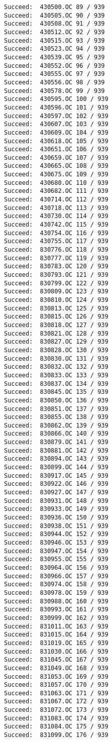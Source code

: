 \documentclass[11pt]{article}
\begin{document}
\begin{verbatim}
Succeed:  430500.OC 89 / 939
Succeed:  430505.OC 90 / 939
Succeed:  430508.OC 91 / 939
Succeed:  430512.OC 92 / 939
Succeed:  430515.OC 93 / 939
Succeed:  430523.OC 94 / 939
Succeed:  430539.OC 95 / 939
Succeed:  430552.OC 96 / 939
Succeed:  430555.OC 97 / 939
Succeed:  430556.OC 98 / 939
Succeed:  430578.OC 99 / 939
Succeed:  430595.OC 100 / 939
Succeed:  430596.OC 101 / 939
Succeed:  430597.OC 102 / 939
Succeed:  430607.OC 103 / 939
Succeed:  430609.OC 104 / 939
Succeed:  430618.OC 105 / 939
Succeed:  430651.OC 106 / 939
Succeed:  430659.OC 107 / 939
Succeed:  430665.OC 108 / 939
Succeed:  430675.OC 109 / 939
Succeed:  430680.OC 110 / 939
Succeed:  430682.OC 111 / 939
Succeed:  430714.OC 112 / 939
Succeed:  430718.OC 113 / 939
Succeed:  430730.OC 114 / 939
Succeed:  430742.OC 115 / 939
Succeed:  430754.OC 116 / 939
Succeed:  430755.OC 117 / 939
Succeed:  830776.OC 118 / 939
Succeed:  830777.OC 119 / 939
Succeed:  830783.OC 120 / 939
Succeed:  830793.OC 121 / 939
Succeed:  830799.OC 122 / 939
Succeed:  830809.OC 123 / 939
Succeed:  830810.OC 124 / 939
Succeed:  830813.OC 125 / 939
Succeed:  830815.OC 126 / 939
Succeed:  830818.OC 127 / 939
Succeed:  830821.OC 128 / 939
Succeed:  830827.OC 129 / 939
Succeed:  830828.OC 130 / 939
Succeed:  830830.OC 131 / 939
Succeed:  830832.OC 132 / 939
Succeed:  830833.OC 133 / 939
Succeed:  830837.OC 134 / 939
Succeed:  830845.OC 135 / 939
Succeed:  830850.OC 136 / 939
Succeed:  830851.OC 137 / 939
Succeed:  830855.OC 138 / 939
Succeed:  830862.OC 139 / 939
Succeed:  830866.OC 140 / 939
Succeed:  830879.OC 141 / 939
Succeed:  830881.OC 142 / 939
Succeed:  830894.OC 143 / 939
Succeed:  830899.OC 144 / 939
Succeed:  830917.OC 145 / 939
Succeed:  830922.OC 146 / 939
Succeed:  830927.OC 147 / 939
Succeed:  830931.OC 148 / 939
Succeed:  830933.OC 149 / 939
Succeed:  830936.OC 150 / 939
Succeed:  830938.OC 151 / 939
Succeed:  830944.OC 152 / 939
Succeed:  830946.OC 153 / 939
Succeed:  830947.OC 154 / 939
Succeed:  830955.OC 155 / 939
Succeed:  830964.OC 156 / 939
Succeed:  830966.OC 157 / 939
Succeed:  830974.OC 158 / 939
Succeed:  830978.OC 159 / 939
Succeed:  830988.OC 160 / 939
Succeed:  830993.OC 161 / 939
Succeed:  830999.OC 162 / 939
Succeed:  831011.OC 163 / 939
Succeed:  831015.OC 164 / 939
Succeed:  831019.OC 165 / 939
Succeed:  831030.OC 166 / 939
Succeed:  831045.OC 167 / 939
Succeed:  831049.OC 168 / 939
Succeed:  831053.OC 169 / 939
Succeed:  831057.OC 170 / 939
Succeed:  831063.OC 171 / 939
Succeed:  831067.OC 172 / 939
Succeed:  831072.OC 173 / 939
Succeed:  831083.OC 174 / 939
Succeed:  831084.OC 175 / 939
Succeed:  831099.OC 176 / 939

\end{verbatim}
\end{document}
